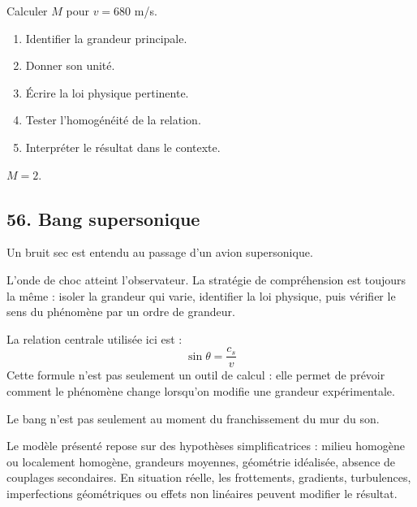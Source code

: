 \documentclass[11pt,a4paper]{article}
\begin{document}
\begin{exercicebox}
Calculer $M$ pour $v=680$ m/s.
\begin{enumerate}
  \item Identifier la grandeur principale.
  \item Donner son unité.
  \item Écrire la loi physique pertinente.
  \item Tester l'homogénéité de la relation.
  \item Interpréter le résultat dans le contexte.
\end{enumerate}
\end{exercicebox}

\begin{corrigebox}[Indication]
$M=2$.
\end{corrigebox}


\subsection{56. Bang supersonique}

\begin{exemplebox}
Un bruit sec est entendu au passage d'un avion supersonique.
\end{exemplebox}

\begin{methodebox}
L'onde de choc atteint l'observateur.
La stratégie de compréhension est toujours la même : isoler la grandeur qui varie, identifier la loi physique, puis vérifier le sens du phénomène par un ordre de grandeur.
\end{methodebox}

\begin{theorembox}
La relation centrale utilisée ici est :
\[
\sin\theta=\frac{c_s}{v}
\]
Cette formule n'est pas seulement un outil de calcul : elle permet de prévoir comment le phénomène change lorsqu'on modifie une grandeur expérimentale.
\end{theorembox}

\begin{odgbox}
Le bang n'est pas seulement au moment du franchissement du mur du son.
\end{odgbox}

\begin{attentionbox}
Le modèle présenté repose sur des hypothèses simplificatrices : milieu homogène ou localement homogène, grandeurs moyennes, géométrie idéalisée, absence de couplages secondaires. En situation réelle, les frottements, gradients, turbulences, imperfections géométriques ou effets non linéaires peuvent modifier le résultat.
\end{attentionbox}
\end{document}
